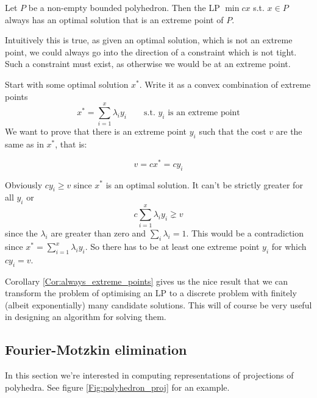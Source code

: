 \begin{cor}\label{Cor:always_extreme_points} Let $P$ be a non-empty bounded polyhedron. Then the LP $\min cx$ s.t. $x\in P$ always has an optimal solution that is an extreme point of $P$.
\end{cor}

Intuitively this is true, as given an optimal solution, which is not an extreme point, we could always go into the direction of a constraint which is not tight. Such a constraint must exist, as otherwise we would be at an extreme point. 

\begin{pr} %
Start with some optimal solution $x^*$. Write it as a convex combination of extreme points 
\[x^* = \sum_{i=1}^x \lambda_i y_i \qquad \text{s.t. } y_i \text{ is an extreme point}\]
We want to prove that there is an extreme point $y_i$ such that the cost $v$ are the same as in $x^{*}$, that is:

\[v = cx^* = cy_i\]

Obviously $cy_i\geq v$ since $x^*$ is an optimal solution. It can't be strictly greater for all $y_i$ or 
\[c\sum_{i=1}^x \lambda_i y_i \gneq v\]
since the $\lambda_i$ are greater than zero and $\sum_i \lambda_i =1$. %
%
%
This would be a contradiction since $x^*=\sum_{i=1}^x \lambda_i y_i$. So there has to be at least one extreme point $y_i$ for which $cy_i=v$.
\end{pr}

Corollary \ref{Cor:always_extreme_points} gives us the nice result that we can transform the problem of optimising an LP to a discrete problem with finitely (albeit exponentially) many candidate solutions. This will of course be very useful in designing an algorithm for solving them.

\subsection*{Fourier-Motzkin elimination}

In this section we're interested in computing representations of projections of polyhedra. See figure \ref{Fig:polyhedron_proj} for an example.

